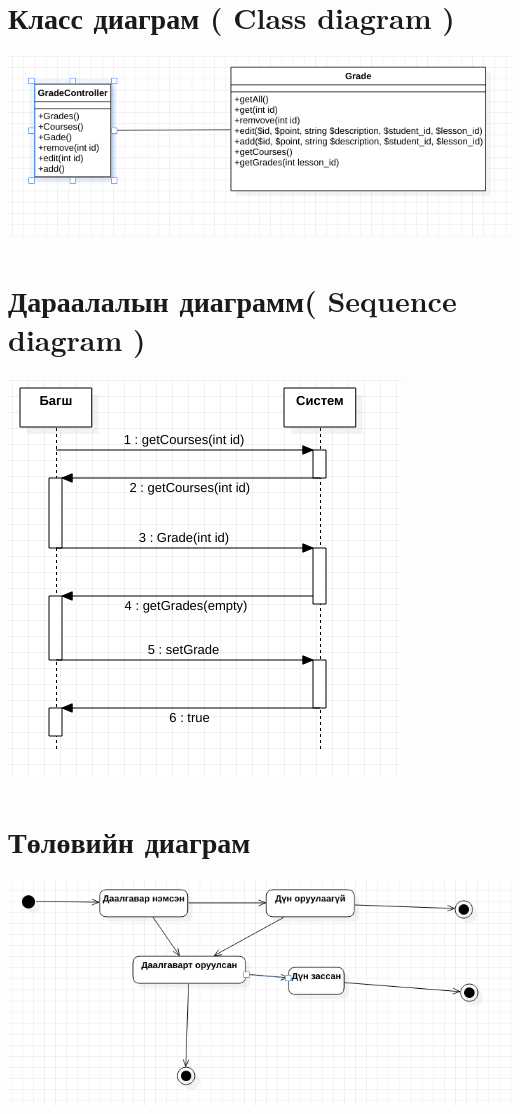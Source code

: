 \documentclass[
oneside, %
english, %
onehalfspacing, %
nolistspacing, %
headsepline, %
]{article} %
\begin{document}
      \section{Класс диаграм ( Class diagram )}
     \includegraphics[width=\textwidth]{cdiagram}
     \section{Дараалалын диаграмм( Sequence diagram )}
     \includegraphics[width=\textwidth]{activityd}
     
      \section{Төлөвийн диаграм }
     \includegraphics[width=\textwidth]{stated}
     
\end{document}
